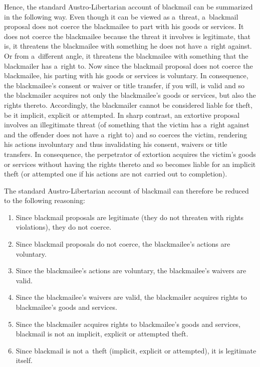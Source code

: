 Hence, the standard Austro-Libertarian account of blackmail can be summarized in the following way. Even though it can be viewed as a~threat, a~blackmail proposal does not coerce the blackmailee to part with his goods or services. It does not coerce the blackmailee because the threat it involves is legitimate, that is, it threatens the blackmailee with something he does not have a~right against. Or from a~different angle, it threatens the blackmailee with something that the blackmailer has a~right to. Now since the blackmail proposal does not coerce the blackmailee, his parting with his goods or services is voluntary. In consequence, the blackmailee's consent or waiver or title transfer, if you will, is valid and so the blackmailer acquires not only the blackmailee's goods or services, but also the rights thereto. Accordingly, the blackmailer cannot be considered liable for theft, be it implicit, explicit or attempted. In sharp contrast, an extortive proposal involves an illegitimate threat (of something that the victim has a~right against and the offender does not have a~right to) and so coerces the victim, rendering his actions involuntary and thus invalidating his consent, waivers or title transfers. In consequence, the perpetrator of extortion acquires the victim's goods or services without having the rights thereto and so becomes liable for an implicit theft (or attempted one if his actions are not carried out to completion).



The standard Austro-Libertarian account of blackmail can therefore be reduced to the following reasoning:



\begin{enumerate}

\item Since blackmail proposals are legitimate (they do not threaten with rights violations), they do not coerce.

\item Since blackmail proposals do not coerce, the blackmailee's actions are voluntary.

\item Since the blackmailee's actions are voluntary, the blackmailee's waivers are valid.

\item Since the blackmailee's waivers are valid, the blackmailer acquires rights to blackmailee's goods and services.

\item Since the blackmailer acquires rights to blackmailee's goods and services, blackmail is not an implicit, explicit or attempted theft.

\item Since blackmail is not a~theft (implicit, explicit or attempted), it is legitimate itself.

\end{enumerate}

